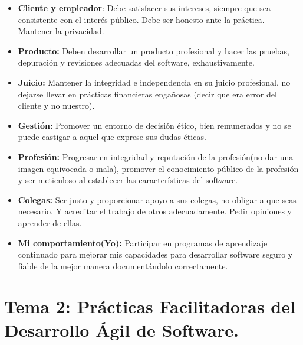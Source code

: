 \documentclass[12pt, twoside, openright]{report} %
\begin{document}
\begin{itemize}
\begin{itemize}
\begin{itemize}
    \item \textbf{Cliente y empleador}: Debe satisfacer sus intereses,
      siempre que sea consistente con el interés público. Debe ser
      honesto ante la práctica. Mantener la privacidad.
      
    \item \textbf{Producto:} Deben desarrollar un producto profesional y
      hacer las pruebas, depuración y revisiones adecuadas del software,
      exhaustivamente.
      
    \item \textbf{Juicio:} Mantener la integridad e independencia en su
      juicio profesional, no dejarse llevar en prácticas financieras
      engañosas (decir que era error del cliente y no nuestro).
      
    \item \textbf{Gestión:} Promover un entorno de decisión ético, bien
      remunerados y no se puede castigar a aquel que exprese sus dudas
      éticas.
      
    \item \textbf{Profesión:} Progresar en integridad y reputación de la
      profesión(no dar una imagen equivocada o mala), promover el
      conocimiento público de la profesión y ser meticuloso al
      establecer las características del software.
      
    \item \textbf{Colegas:} Ser justo y proporcionar apoyo a sus colegas, no
      obligar a que seas necesario. Y acreditar el trabajo de otros
      adecuadamente. Pedir opiniones y aprender de ellas.
      
    \item \textbf{Mi comportamiento(Yo):} Participar en programas de
      aprendizaje continuado para mejorar mis capacidades para
      desarrollar software seguro y fiable de la mejor manera
      documentándolo correctamente.
      
    \end{itemize}
  \end{itemize}
\end{itemize}
\chapter{Tema 2: Prácticas Facilitadoras del Desarrollo Ágil de Software.}
\end{document}
